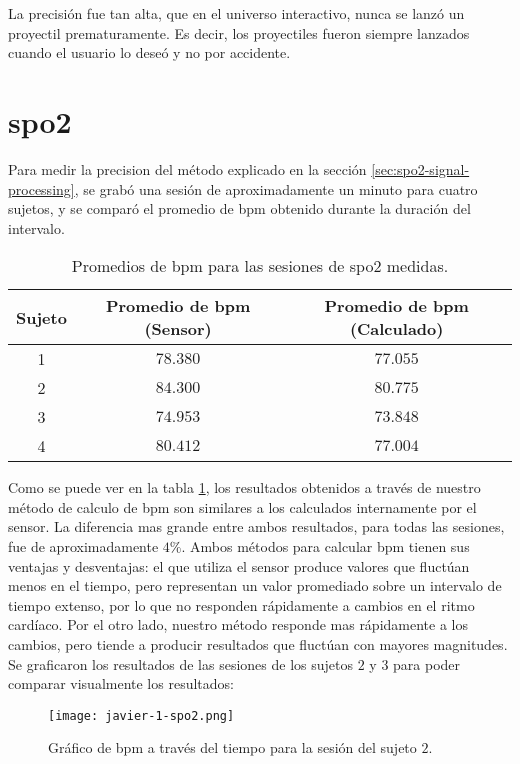 La precisión fue tan alta, que en el universo interactivo, nunca se lanzó un proyectil prematuramente. Es decir, los proyectiles fueron siempre lanzados cuando el usuario lo deseó y no por accidente.

\section{\acrshort{spo2}}

Para medir la precision del método explicado en la sección \ref{sec:spo2-signal-processing}, se grabó una sesión de aproximadamente un minuto para cuatro sujetos, y se comparó el promedio de \acrshort{bpm} obtenido durante la duración del intervalo.

\begin{table}[H]
\centering
\begin{tabular}{ |c|c|c| } 
 \hline
 Sujeto & Promedio de \acrshort{bpm} (Sensor) & Promedio de \acrshort{bpm} (Calculado) \\ 
 \hline
 1 & $78.380$ & $77.055$ \\
 \hline
 2 & $84.300$ & $80.775$ \\
 \hline
 3 & $74.953$ & $73.848$ \\
 \hline
 4 & $80.412$ & $77.004$ \\

 \hline
\end{tabular}
\caption{Promedios de \acrshort{bpm} para las sesiones de \acrshort{spo2} medidas.}
\label{tab:spo2-results}
\end{table}

Como se puede ver en la tabla \ref{tab:spo2-results}, los resultados obtenidos a través de nuestro método de calculo de \acrshort{bpm} son similares a los calculados internamente por el sensor. La diferencia mas grande entre ambos resultados, para todas las sesiones, fue de aproximadamente $4\%$. Ambos métodos para calcular \acrshort{bpm} tienen sus ventajas y desventajas: el que utiliza el sensor produce valores que fluctúan menos en el tiempo, pero representan un valor promediado sobre un intervalo de tiempo extenso, por lo que no responden rápidamente a cambios en el ritmo cardíaco. Por el otro lado, nuestro método responde mas rápidamente a los cambios, pero tiende a producir resultados que fluctúan con mayores magnitudes. Se graficaron los resultados de las sesiones de los sujetos $2$ y $3$ para poder comparar visualmente los resultados:

\begin{figure}[H]
	\centering
    \texttt{[image: javier-1-spo2.png]}
    \caption{Gráfico de \acrshort{bpm} a través del tiempo para la sesión del sujeto $2$.}
	\label{fig:spo2-graph-2}
\end{figure}

